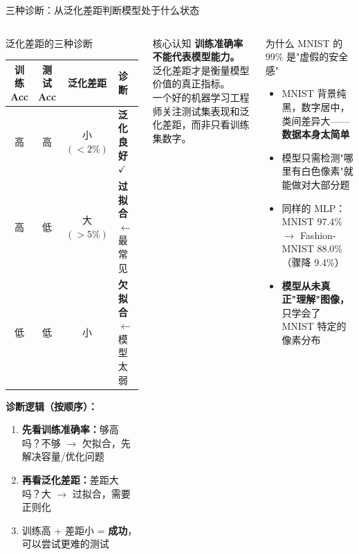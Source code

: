 \documentclass[aspectratio=169]{ctexbeamer}
\begin{document}
\begin{frame}[shrink=20]{三种诊断：从泛化差距判断模型处于什么状态}
\small

\begin{columns}[T]
\begin{block}{泛化差距的三种诊断}
\footnotesize
\centering
\begin{tabular}{c c c l}
\toprule
训练 Acc & 测试 Acc & 泛化差距 & 诊断 \\
\midrule
高 & 高 & 小 $(<2\%)$ & \textbf{泛化良好} $\checkmark$ \\
高 & 低 & 大 $(>5\%)$ & \textbf{过拟合} $\leftarrow$ 最常见 \\
低 & 低 & 小 & \textbf{欠拟合} $\leftarrow$ 模型太弱 \\
\bottomrule
\end{tabular}

\vspace{0.1cm}
\textbf{诊断逻辑（按顺序）：}
\begin{enumerate}
  \item \textbf{先看训练准确率：}够高吗？不够 $\to$ 欠拟合，先解决容量/优化问题
  \item \textbf{再看泛化差距：}差距大吗？大 $\to$ 过拟合，需要正则化
  \item 训练高 + 差距小 = \textbf{成功}，可以尝试更难的测试
\end{enumerate}
\end{block}

\vspace{0.1cm}

\begin{alertblock}{核心认知}
\footnotesize
\textbf{训练准确率不能代表模型能力。} 泛化差距才是衡量模型价值的真正指标。\\
一个好的机器学习工程师关注测试集表现和泛化差距，而非只看训练集数字。
\end{alertblock}

\begin{block}{为什么 MNIST 的 99\% 是"虚假的安全感"}
\footnotesize
\begin{itemize}
  \item MNIST 背景纯黑，数字居中，类间差异大——\textbf{数据本身太简单}
  \item 模型只需检测"哪里有白色像素"就能做对大部分题
  \item 同样的 MLP：MNIST 97.4\% $\to$ Fashion-MNIST 88.0\%（骤降 9.4\%）
  \item \textbf{模型从未真正"理解"图像，} 只学会了 MNIST 特定的像素分布
\end{itemize}
\end{block}


\end{columns}
\end{frame}
\end{document}
